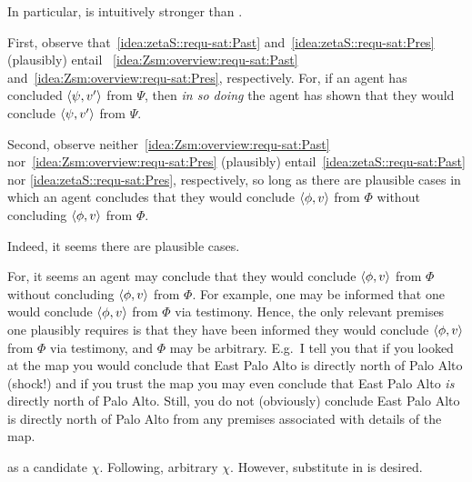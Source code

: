 \begin{note}
  In particular, \izetaS{} is intuitively stronger than \izetaSm{}.

  First, observe that~\ref{idea:zetaS::requ-sat:Past} and~\ref{idea:zetaS::requ-sat:Pres} (plausibly) entail ~\ref{idea:Zsm:overview:requ-sat:Past} and~\ref{idea:Zsm:overview:requ-sat:Pres}, respectively.
  For, if an agent has concluded \(\langle \psi, v' \rangle\) from \(\Psi\), then \emph{in so doing} the agent has shown that they would conclude \(\langle \psi, v' \rangle\) from \(\Psi\).

  Second, observe neither~\ref{idea:Zsm:overview:requ-sat:Past} nor~\ref{idea:Zsm:overview:requ-sat:Pres} (plausibly) entail~\ref{idea:zetaS::requ-sat:Past} nor \ref{idea:zetaS::requ-sat:Pres}, respectively, so long as there are plausible cases in which an agent concludes that they would conclude \(\langle \phi, v \rangle\) from \(\Phi\) without concluding \(\langle \phi, v \rangle\) from \(\Phi\).

  Indeed, it seems there are plausible cases.

  For, it seems an agent may conclude that they would conclude \(\langle \phi, v \rangle\) from \(\Phi\) without concluding \(\langle \phi, v \rangle\) from \(\Phi\).
  For example, one may be informed that one would conclude \(\langle \phi, v \rangle\) from \(\Phi\) via testimony.
  Hence, the only relevant premises one plausibly requires is that they have been informed they would conclude \(\langle \phi, v \rangle\) from \(\Phi\) via testimony, and \(\Phi\) may be arbitrary.
  E.g.\ I tell you that if you looked at the map you would conclude that East Palo Alto is directly north of Palo Alto (shock!) and if you trust the map you may even conclude that East Palo Alto \emph{is} directly north of Palo Alto.
  Still, you do not (obviously) conclude East Palo Alto is directly north of Palo Alto from any premises associated with details of the map.
\end{note}

\begin{note}
  \izetaSm{} as a candidate \(\chi\).
  {
    \color{red}
    Following, arbitrary \(\chi\).
    However, substitute in \izetaSm{} is desired.
  }
\end{note}

